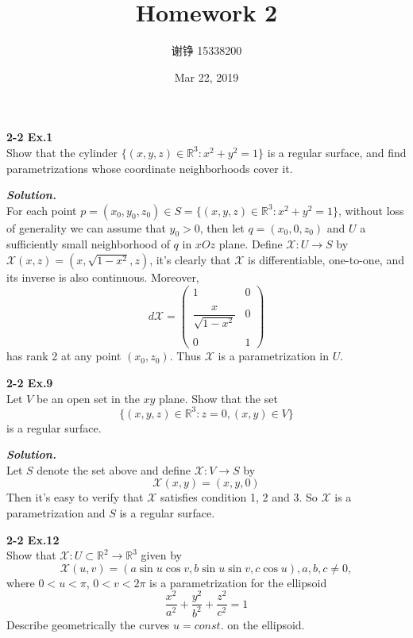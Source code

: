 \documentclass{article}
\begin{document}
\author{谢铮 15338200}
\title{Homework 2}
\date{Mar 22, 2019}
\maketitle

\setlength\parindent{0em}   %
\setlength\parskip{1.0\baselineskip} %

\par
\textbf{2-2 Ex.1}\\
Show that the cylinder $\{(x,y,z) \in \mathbb{R}^3: x^2+y^2=1\}$ is a regular surface, and find parametrizations whose
coordinate neighborhoods cover it.

\par
\textbf{\textit{Solution.}}\\
For each point $p = (x_0, y_0, z_0) \in S = \{(x,y,z) \in \mathbb{R}^3: x^2+y^2=1\}$, without loss of generality we can 
assume that $y_0 > 0$, then let $q = (x_0, 0, z_0)$ and $U$ a sufficiently small neighborhood of $q$ in $xOz$ plane.
Define $\mathcal{X}: U \to S$ by $\mathcal{X}(x,z)=(x,\sqrt{1-x^2}, z)$, it's clearly that
$\mathcal{X}$ is differentiable, one-to-one, and its inverse is also continuous. Moreover,
$$
    d\mathcal{X} = 
    \left(
        \begin{array}{cc}
            1 & 0\\\\
            \dfrac{x}{\sqrt{1-x^2}} & 0\\\\
            0 & 1
        \end{array}
    \right)
$$
has rank 2 at any point $(x_0, z_0)$. Thus $\mathcal{X}$ is a parametrization in $U$. \qedsymbol

\par
\textbf{2-2 Ex.9}\\
Let $V$ be an open set in the $xy$ plane. Show that the set
$$
    \{(x,y,z) \in \mathbb{R}^3: z=0,(x,y) \in V\}
$$
is a regular surface.\\

\par
\textbf{\textit{Solution.}}\\
Let $S$ denote the set above and define $\mathcal{X}: V \to S$ by
$$
    \mathcal{X}(x,y) = (x,y,0)
$$
Then it's easy to verify that $\mathcal{X}$ satisfies condition 1, 2 and 3. So $\mathcal{X}$ is
a parametrization and $S$ is a regular surface. \qedsymbol

\par
\textbf{2-2 Ex.12}\\
Show that $\mathcal{X}: U \subset \mathbb{R}^2 \to \mathbb{R}^3$ given by 
$$
    \mathcal{X}(u,v) = (a \sin u \cos v, b \sin u \sin v, c \cos u), a, b, c \neq 0,
$$
where $0<u<\pi$, $0<v<2 \pi$ is a parametrization for the ellipsoid
$$
    \frac{x^2}{a^2} + \frac{y^2}{b^2} + \frac{z^2}{c^2} = 1
$$
Describe geometrically the curves $u = const.$ on the ellipsoid.\\
\end{document}
